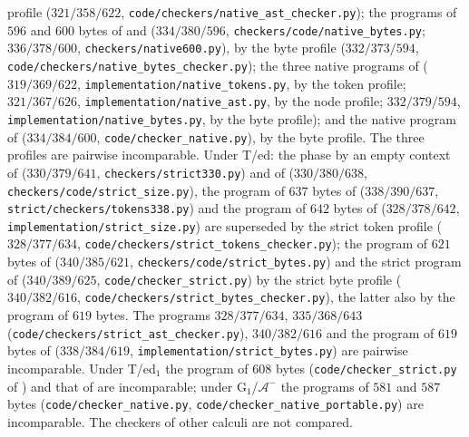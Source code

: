 profile ($321/358/622$, \texttt{code/checkers/native\_ast\_checker.py}); the
programs of $596$ and $600$ bytes of  and
 ($334/380/596$, \texttt{checkers/code/native\_bytes.py};
$336/378/600$, \texttt{checkers/native600.py}), by the byte profile
($332/373/594$, \texttt{code/checkers/native\_bytes\_checker.py}); the three
native programs of  ($319/369/622$,
\texttt{implementation/native\_tokens.py}, by the token profile;
$321/367/626$, \texttt{implementation/native\_ast.py}, by the node profile;
$332/379/594$, \texttt{implementation/native\_bytes.py}, by the byte profile);
and the native program of  ($334/384/600$,
\texttt{code/checker\_native.py}), by the byte profile. The three profiles are
pairwise incomparable. Under T/ed: the phase by an empty context of
 ($330/379/641$, \texttt{checkers/strict330.py}) and of
 ($330/380/638$, \texttt{checkers/code/strict\_size.py}), the
program of $637$ bytes of  ($338/390/637$,
\texttt{strict/checkers/tokens338.py}) and the program of $642$ bytes of
 ($328/378/642$, \texttt{implementation/strict\_size.py})
are superseded by the strict token profile ($328/377/634$,
\texttt{code/checkers/strict\_tokens\_checker.py}); the program of $621$ bytes of
 ($340/385/621$, \texttt{checkers/code/strict\_bytes.py}) and
the strict program of  ($340/389/625$,
\texttt{code/checker\_strict.py}) by the strict byte profile ($340/382/616$,
\texttt{code/checkers/strict\_bytes\_checker.py}), the latter also by the
program of $619$ bytes. The programs $328/377/634$, $335/368/643$
(\texttt{code/checkers/strict\_ast\_checker.py}), $340/382/616$ and the program of
$619$ bytes of  ($338/384/619$,
\texttt{implementation/strict\_bytes.py}) are pairwise incomparable. Under
T/ed$_1$ the program of $608$ bytes (\texttt{code/checker\_strict.py} of
) and that of  are incomparable;
under G$_1$/$\mathcal A^{-}$ the programs of $581$ and $587$ bytes
(\texttt{code/checker\_native.py}, \texttt{code/checker\_native\_portable.py})
are incomparable. The checkers of other calculi are not compared.


